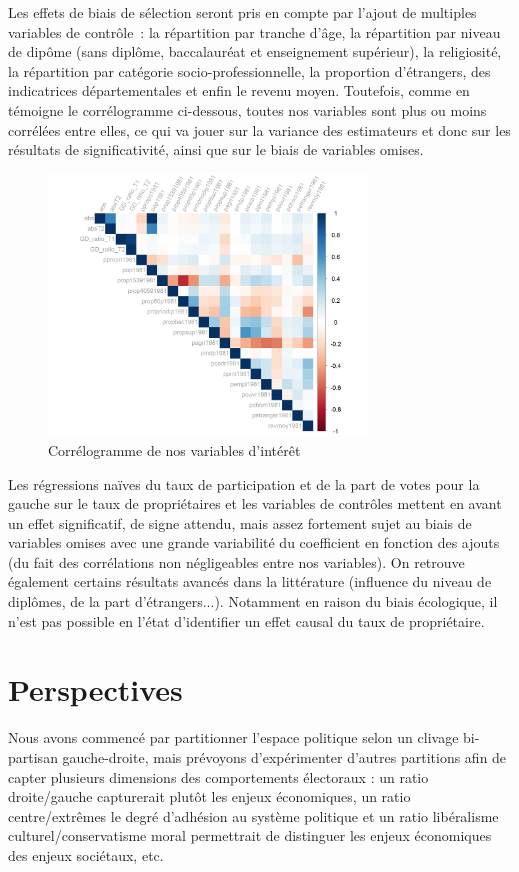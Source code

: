 \documentclass[a4paper,14pt]{article}
\begin{document}
\begin{multicols}{2}
Les effets de biais de sélection seront pris en compte par l'ajout de multiples variables de contrôle~: la répartition par tranche d'âge, la répartition par niveau de dipôme (sans diplôme, baccalauréat et enseignement supérieur), la religiosité, la répartition par catégorie socio-professionnelle, la proportion d'étrangers, des indicatrices départementales et enfin le revenu moyen. Toutefois, comme en témoigne le corrélogramme ci-dessous, toutes nos variables sont plus ou moins corrélées entre elles, ce qui va jouer sur la variance des estimateurs et donc sur les résultats de significativité, ainsi que sur le biais de variables omises.

\begin{figure}[H]
    \centering
         \includegraphics[width=8.5cm]{correlogramme.jpg}
         \caption{Corrélogramme de nos variables d'intérêt} 
    \end{figure}
    
Les régressions naïves du taux de participation et de la part de votes pour la gauche sur le taux de propriétaires et les variables de contrôles mettent en avant un effet significatif, de signe attendu, mais assez fortement sujet au biais de variables omises avec une grande variabilité du coefficient en fonction des ajouts (du fait des corrélations non négligeables entre nos variables). On retrouve également certains résultats avancés dans la littérature (influence du niveau de diplômes, de la part d'étrangers...). Notamment en raison du biais écologique, il n'est pas possible en l'état d'identifier un effet causal du taux de propriétaire.



\section*{Perspectives}
Nous avons commencé par partitionner l'espace politique selon un clivage bi-partisan gauche-droite, mais prévoyons d'expérimenter d'autres partitions afin de capter plusieurs dimensions des comportements électoraux : un ratio droite/gauche capturerait plutôt les enjeux économiques, un ratio centre/extrêmes le degré d'adhésion au système politique et un ratio libéralisme culturel/conservatisme moral permettrait de distinguer les enjeux économiques des enjeux sociétaux, etc.


\end{multicols}
\end{document}
